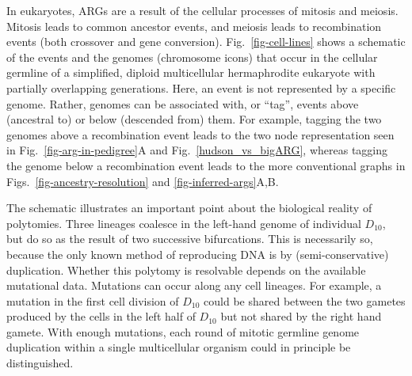 \documentclass[9pt,twocolumn,twoside]{gsajnl}
\begin{document}
In eukaryotes, ARGs are a result of the cellular processes of mitosis and meiosis.
Mitosis leads to common ancestor events,
and meiosis leads to recombination events (both crossover and gene conversion).
Fig.~\ref{fig-cell-lines} shows a schematic of the events  and
the genomes (chromosome icons) that occur in the cellular
germline of a simplified, diploid multicellular
hermaphrodite eukaryote with partially overlapping generations.
Here, an event is not represented by a specific
genome. Rather, genomes can be associated with, or ``tag'', events above
(ancestral to) or below (descended from) them.
For example, tagging the two genomes above a recombination event leads to the
two node representation seen in
Fig.~\ref{fig-arg-in-pedigree}A and Fig.~\ref{hudson_vs_bigARG},
whereas tagging the genome
below a recombination event leads to the more
conventional graphs in Figs.~\ref{fig-ancestry-resolution} and \ref{fig-inferred-args}A,B.

The schematic illustrates an important point about the biological reality of polytomies.
Three lineages coalesce in the left-hand genome of individual $D_{10}$, but do
so as the result of two successive bifurcations. This is necessarily so,
because the only known method of reproducing DNA is by (semi-conservative) duplication.
Whether this polytomy is resolvable depends on the available mutational data.
Mutations can occur along any cell lineages. For example,
a mutation in the first cell division of $D_{10}$ could be shared between
the two gametes produced by the cells in the left half of $D_{10}$
but not shared by the right hand gamete.
With enough mutations, each
round of mitotic germline genome duplication within a single multicellular organism could
in principle be distinguished.
\end{document}
